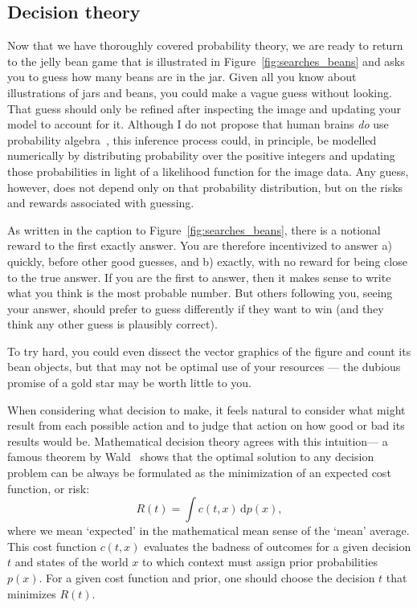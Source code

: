 \subsection{Decision theory}
Now that we have thoroughly covered probability theory, we are ready to return
to the jelly bean game that is illustrated in Figure~\ref{fig:searches_beans}
and asks you to guess how many beans are in the jar.
Given all you know about illustrations of jars and beans, you could make a
vague guess without looking.
That guess should only be refined after inspecting the image and updating your
model to account for it.
Although I do not propose that human brains \emph{do} use probability
algebra~\cite{jaynes1988brain}, this inference process could, in principle,
be modelled numerically by distributing probability over the positive integers
and updating those probabilities in light of a likelihood function for the
image data.
Any guess, however, does not depend only on that probability distribution,
but on the risks and rewards associated with guessing.

As written in the caption to Figure~\ref{fig:searches_beans}, there is a
notional reward to the first exactly answer.
You are therefore incentivized to answer a) quickly, before other good guesses,
and b) exactly, with no reward for being close to the true answer.
If you are the first to answer, then it makes sense to write what you think
is the most probable number.
But others following you, seeing your answer, should prefer to guess
differently if they want to win (and they think any other guess is plausibly
correct).

To try hard, you could even dissect the vector graphics of the figure and count
its bean objects, but that may not be optimal use of your resources --- the
dubious promise of a gold star may be worth little to you.

When considering what decision to make, it feels natural to consider what
might result from each possible action and to judge that action on how good or
bad its results would be.
Mathematical decision theory agrees with this intuition---
a famous theorem by Wald~\cite{
wald1947bayes,
wald1950bayes,
jaynes2003probability
}
shows that the optimal solution to any decision problem can be always be
formulated as the minimization of an expected cost function, or risk:
\begin{equation}
\label{eqn:searches_bayes_decision_rule}
R(t) = \int\! c(t, x) \,\mathrm{d}p(x)
,
\end{equation}
where we mean `expected' in the mathematical mean sense of the `mean' average.
This cost function $c(t, x)$ evaluates the badness of outcomes for a given
decision $t$ and states of the world $x$ to which context must assign prior
probabilities $p(x)$.
For a given cost function and prior, one should choose the decision $t$ that
minimizes $R(t)$.

